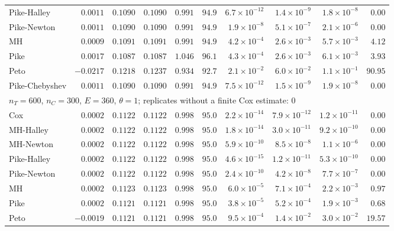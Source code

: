 \begin{landscape}
\begin{longtable}{lrrrrrrrrr}
Pike-Halley & $0.0011$ & $0.1090$ & $0.1090$ & $0.991$ & $94.9$ & $6.7 \times 10^{-12}$ & $1.4 \times 10^{-9}$ & $1.8 \times 10^{-8}$ & $0.00$ \\
Pike-Newton & $0.0011$ & $0.1090$ & $0.1090$ & $0.991$ & $94.9$ & $1.9 \times 10^{-8}$ & $5.1 \times 10^{-7}$ & $2.1 \times 10^{-6}$ & $0.00$ \\
MH & $0.0009$ & $0.1091$ & $0.1091$ & $0.991$ & $94.9$ & $4.2 \times 10^{-4}$ & $2.6 \times 10^{-3}$ & $5.7 \times 10^{-3}$ & $4.12$ \\
Pike & $0.0017$ & $0.1087$ & $0.1087$ & $1.046$ & $96.1$ & $4.3 \times 10^{-4}$ & $2.6 \times 10^{-3}$ & $6.1 \times 10^{-3}$ & $3.93$ \\
Peto & $-0.0217$ & $0.1218$ & $0.1237$ & $0.934$ & $92.7$ & $2.1 \times 10^{-2}$ & $6.0 \times 10^{-2}$ & $1.1 \times 10^{-1}$ & $90.95$ \\
Pike-Chebyshev & $0.0011$ & $0.1090$ & $0.1090$ & $0.991$ & $94.9$ & $7.5 \times 10^{-12}$ & $1.5 \times 10^{-9}$ & $1.9 \times 10^{-8}$ & $0.00$ \\
\multicolumn{10}{l}{$n_T = 600$, $n_C = 300$, $E = 360$, $\theta = 1$; replicates without a finite Cox estimate: 0} \\
Cox & $0.0002$ & $0.1122$ & $0.1122$ & $0.998$ & $95.0$ & $2.2 \times 10^{-14}$ & $7.9 \times 10^{-12}$ & $1.2 \times 10^{-11}$ & $0.00$ \\
MH-Halley & $0.0002$ & $0.1122$ & $0.1122$ & $0.998$ & $95.0$ & $1.8 \times 10^{-14}$ & $3.0 \times 10^{-11}$ & $9.2 \times 10^{-10}$ & $0.00$ \\
MH-Newton & $0.0002$ & $0.1122$ & $0.1122$ & $0.998$ & $95.0$ & $5.9 \times 10^{-10}$ & $8.5 \times 10^{-8}$ & $1.1 \times 10^{-6}$ & $0.00$ \\
Pike-Halley & $0.0002$ & $0.1122$ & $0.1122$ & $0.998$ & $95.0$ & $4.6 \times 10^{-15}$ & $1.2 \times 10^{-11}$ & $5.3 \times 10^{-10}$ & $0.00$ \\
Pike-Newton & $0.0002$ & $0.1122$ & $0.1122$ & $0.998$ & $95.0$ & $2.4 \times 10^{-10}$ & $4.2 \times 10^{-8}$ & $7.7 \times 10^{-7}$ & $0.00$ \\
MH & $0.0002$ & $0.1123$ & $0.1123$ & $0.998$ & $95.0$ & $6.0 \times 10^{-5}$ & $7.1 \times 10^{-4}$ & $2.2 \times 10^{-3}$ & $0.97$ \\
Pike & $0.0002$ & $0.1121$ & $0.1121$ & $0.998$ & $95.0$ & $3.8 \times 10^{-5}$ & $5.2 \times 10^{-4}$ & $1.9 \times 10^{-3}$ & $0.68$ \\
Peto & $-0.0019$ & $0.1121$ & $0.1121$ & $0.998$ & $95.0$ & $9.5 \times 10^{-4}$ & $1.4 \times 10^{-2}$ & $3.0 \times 10^{-2}$ & $19.57$ \\

\end{longtable}
\end{landscape}
